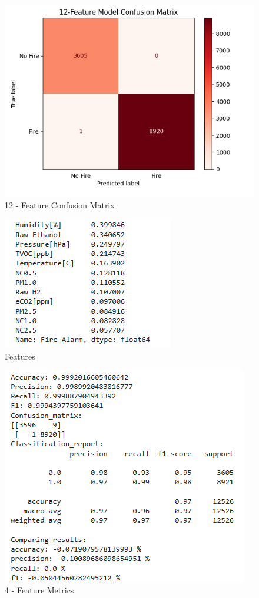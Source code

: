 \documentclass[conference]{IEEEtran}
\begin{document}
\begin{figure}
    \centering
    \includegraphics[width=0.75\linewidth]{images/12CMM.png}
    \caption{12 - Feature Confusion Matrix}
    \label{fig:1.3}
\end{figure}

\begin{figure}
    \centering
    \includegraphics[width=0.7\linewidth]{images/Corr.png}
    \caption{Features}
    \label{fig:2.0-label}
\end{figure}

\begin{figure}
    \centering
    \includegraphics[width=0.75\linewidth]{images/4metric.png}
    \caption{4 - Feature Metrics}
    \label{fig:3.0}
\end{figure}
\end{document}
